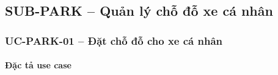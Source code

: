 \subsection{SUB-PARK -- Quản lý chỗ đỗ xe cá nhân}


\subsubsection{UC-PARK-01 -- Đặt chỗ đỗ cho xe cá nhân}


\paragraph{Đặc tả use case}
\small
